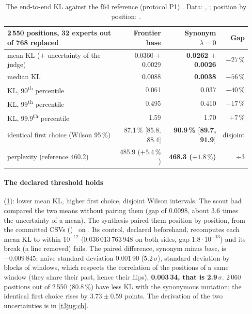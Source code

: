 \begin{table}[tbp]
\centering\small
\begin{tabular}{l r r r}
\toprule
2\,550 positions, 32 experts out of 768 replaced & Frontier base & \textbf{Synonym $\lambda = 0$} & Gap \\
\midrule
mean KL ($\pm$ uncertainty of the judge) & 0.0360 $\pm$ 0.0029 & \textbf{0.0262 $\pm$ 0.0026} & $-27\,\%$ \\
median KL & 0.0088 & \textbf{0.0038} & $-56\,\%$ \\
KL, 90\textsuperscript{th} percentile & 0.061 & 0.037 & $-40\,\%$ \\
KL, 99\textsuperscript{th} percentile & 0.495 & 0.410 & $-17\,\%$ \\
KL, 99.9\textsuperscript{th} percentile & 1.59 & 1.70 & $+7\,\%$ \\
identical first choice (Wilson 95\,\%) & 87.1\,\% [85.8, 88.4] & \textbf{90.9\,\% [89.7, 91.9]} & disjoint \\
perplexity (reference 460.2) & 485.9 ($+5.4\,\%$) & \textbf{468.3 ($+1.8\,\%$)} & $\div 3$ \\
\bottomrule
\end{tabular}
\caption[The end-to-end KL, base against synonymous mutation]{The end-to-end KL against the f64 reference (protocol P1) \mes. Data: , ; position by position: .}
\label{t3ecl:tab:kl}
\end{table}

\paragraph{The declared threshold holds} (\cref{t3ecl:tab:kl}): lower mean KL, higher first choice, disjoint Wilson intervals. The scout had compared the two means without pairing them (gap of 0.0098, about 3.6 times the uncertainty of a mean). The synthesis paired them position by position, from the committed CSVs () \calc~on \mes. Its control, declared beforehand, recomputes each mean KL to within $10^{-12}$ (0.036\,013\,763\,948 on both sides, gap $1.8\cdot10^{-13}$) and its break (a line removed) fails. The paired difference, synonym minus base, is \textbf{$-0.009\,845$}; naive standard deviation 0.001\,90 (5.2\,$\sigma$), standard deviation by blocks of windows, which respects the correlation of the positions of a same window (they share their past, hence their flips), \textbf{0.003\,34, that is 2.9\,$\sigma$}. 2\,060 positions out of 2\,550 (80.8\,\%) have less KL with the synonymous mutation; the identical first choice rises by $3.73 \pm 0.59$ points. The derivation of the two uncertainties is in \cref{t3jug:ch}.

